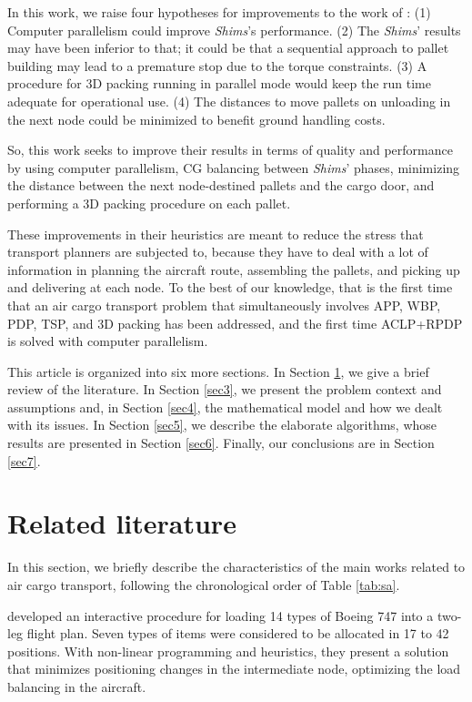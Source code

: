 \documentclass[preprint,authoryear]{elsarticle}
\begin{document}
In this work, we raise four hypotheses for improvements to the work of \cite{MesquitaSanches2023}: 
(1) Computer parallelism could improve {\it Shims}'s performance.
(2) The {\it Shims}' results may have been inferior to that; it could be that a sequential approach to pallet building may lead to a premature stop due to the torque constraints.
(3) A procedure for 3D packing running in parallel mode would keep the run time adequate for operational use.
(4) The distances to move pallets on unloading in the next node could be minimized to benefit ground handling costs.


So, this work seeks to improve their results in terms of quality and performance by using computer parallelism, CG balancing between {\it Shims}' phases, minimizing the distance between the next node-destined pallets and the cargo door, and performing a 3D packing procedure on each pallet.

These improvements in their heuristics are meant to reduce the stress that transport planners are subjected to, because they have to deal with a lot of information in planning the aircraft route, assembling the pallets, and picking up and delivering at each node. To the best of our knowledge, that is the first time that an air cargo transport problem that simultaneously involves APP, WBP, PDP, TSP, and 3D packing has been addressed, and the first time ACLP+RPDP is solved with computer parallelism.

This article is organized into six more sections. In Section \ref{sec2}, we give a brief review of the literature. In Section \ref{sec3}, we present the problem context and assumptions and, in Section \ref{sec4}, the mathematical model and how we dealt with its issues. In Section \ref{sec5}, we describe the elaborate algorithms, whose results are presented in Section \ref{sec6}. Finally, our conclusions are in Section \ref{sec7}.


\section{Related literature}
\label{sec2}

In this section, we briefly describe the characteristics of the main works related to air cargo transport, following the chronological order of Table \ref{tab:sa}.

\cite{LarsenMikkelsen1979} developed an interactive procedure for loading 14 types of Boeing 747 into a two-leg flight plan. Seven types of items were considered to be allocated in 17 to 42 positions. With non-linear programming and heuristics, they present a solution that minimizes positioning changes in the intermediate node, optimizing the load balancing in the aircraft.
\end{document}
